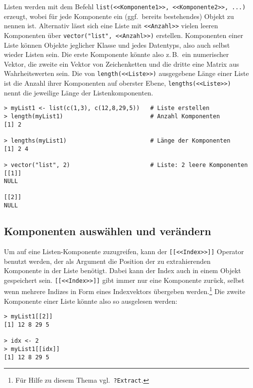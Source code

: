Listen werden mit dem Befehl \lstinline!list(<<Komponente1>>, <<Komponente2>>, ...)! erzeugt, wobei für jede Komponente ein (ggf.\ bereits bestehendes) Objekt zu nennen ist. Alternativ lässt sich eine Liste mit \lstinline!<<Anzahl>>! vielen leeren Komponenten über \lstinline!vector("list", <<Anzahl>>)! erstellen. Komponenten einer Liste können Objekte jeglicher Klasse und jedes Datentyps, also auch selbst wieder Listen sein. Die erste Komponente könnte also z.\,B.\ ein numerischer Vektor, die zweite ein Vektor von Zeichenketten und die dritte eine Matrix aus Wahrheitswerten sein. Die von \lstinline!length(<<Liste>>)! ausgegebene Länge einer Liste ist die Anzahl ihrer Komponenten auf oberster Ebene, \lstinline!lengths(<<Liste>>)! nennt die jeweilige Länge der Listenkomponenten.
\begin{lstlisting}
> myList1 <- list(c(1,3), c(12,8,29,5))   # Liste erstellen
> length(myList1)                         # Anzahl Komponenten
[1] 2

> lengths(myList1)                        # Länge der Komponenten
[1] 2 4

> vector("list", 2)                       # Liste: 2 leere Komponenten
[[1]]
NULL

[[2]]
NULL
\end{lstlisting}

\subsection{Komponenten auswählen und verändern}
\label{sec:listExtract}

Um auf eine Listen-Komponente zuzugreifen, kann der \lstinline![[<<Index>>]]! Operator benutzt werden, der als Argument die Position der zu extrahierenden Komponente in der Liste benötigt. Dabei kann der Index auch in einem Objekt gespeichert sein. \lstinline![[<<Index>>]]! gibt immer nur eine Komponente zurück, selbst wenn mehrere Indizes in Form eines Indexvektors übergeben werden.\footnote{Für Hilfe zu diesem Thema vgl.\ \lstinline!?Extract!.} Die zweite Komponente einer Liste könnte also so ausgelesen werden:
\begin{lstlisting}
> myList1[[2]]
[1] 12 8 29 5

> idx <- 2
> myList1[[idx]]
[1] 12 8 29 5
\end{lstlisting}

